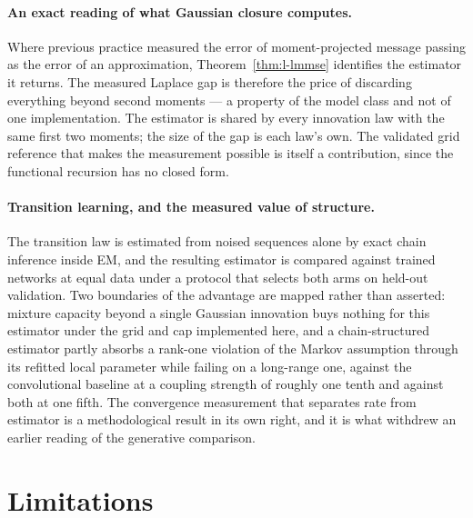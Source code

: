 \paragraph{An exact reading of what Gaussian closure computes.} Where previous
practice measured the error of moment-projected message passing as the error of
an approximation, Theorem~\ref{thm:l-lmmse} identifies the estimator it returns.
The measured Laplace gap is therefore the price of discarding everything beyond
second moments --- a property of the model class and not of one
implementation. The estimator is shared by every innovation law with the same
first two moments; the size of the gap is each law's own.
The validated grid reference that makes the measurement possible is itself a
contribution, since the functional recursion has no closed form.

\paragraph{Transition learning, and the measured value of structure.} The
transition law is estimated from noised sequences alone by exact chain inference
inside EM, and the resulting estimator is compared against trained networks at
equal data under a protocol that selects both arms on held-out validation. Two
boundaries of the advantage are mapped rather than asserted: mixture capacity
beyond a single Gaussian innovation buys nothing for this estimator under the
grid and cap implemented here, and a chain-structured estimator partly absorbs a rank-one violation of the
Markov assumption through its refitted local parameter while failing on a
long-range one, against the convolutional baseline at a coupling strength of
roughly one tenth and against both at one fifth. The convergence
measurement that separates rate from estimator is a methodological result in its
own right, and it is what withdrew an earlier reading of the generative
comparison.

\section{Limitations}

